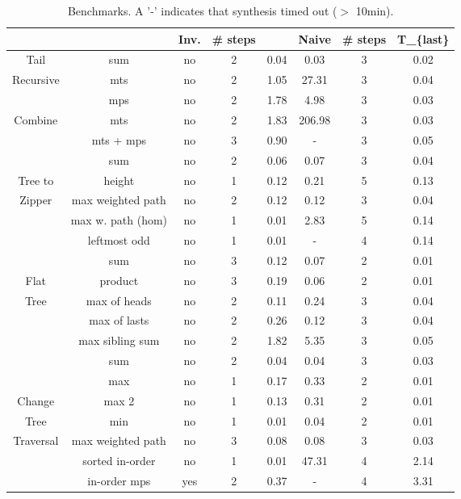 \begin{table}
	\caption{Benchmarks. A '-' indicates that synthesis timed out ($>$ 10min).}\label{table:experiments}
	{
		\begin{tabular}[h]{|c|c|c|c|c|c|c|c|}
			\hline
			 &   & Inv. & \# steps & \tool  & Naive & \# steps & T_\{last\}\\ 
			\hline
			Tail & sum & no & 2 & 0.04 & 0.03 & 3 & 0.02\\ 
			Recursive & mts & no & 2 & 1.05 & 27.31 & 3 & 0.04\\ 
			 & mps & no & 2 & 1.78 & 4.98 & 3 & 0.03\\ 
			\hline
			Combine & mts & no & 2 & 1.83 & 206.98 & 3 & 0.03\\ 
			 & mts + mps & no & 3 & 0.90 & - & 3 & 0.05\\ 
			\hline
			 & sum & no & 2 & 0.06 & 0.07 & 3 & 0.04\\ 
			Tree to & height & no & 1 & 0.12 & 0.21 & 5 & 0.13\\ 
			Zipper & max weighted path & no & 2 & 0.12 & 0.12 & 3 & 0.04\\ 
			 & max w. path (hom) & no & 1 & 0.01 & 2.83 & 5 & 0.14\\ 
			 & leftmost odd & no & 1 & 0.01 & - & 4 & 0.14\\ 
			\hline
			 & sum & no & 3 & 0.12 & 0.07 & 2 & 0.01\\ 
			Flat & product & no & 3 & 0.19 & 0.06 & 2 & 0.01\\ 
			Tree & max of heads & no & 2 & 0.11 & 0.24 & 3 & 0.04\\ 
			 & max of lasts & no & 2 & 0.26 & 0.12 & 3 & 0.04\\ 
			 & max sibling sum & no & 2 & 1.82 & 5.35 & 3 & 0.05\\ 
			\hline
			 & sum & no & 2 & 0.04 & 0.04 & 3 & 0.03\\ 
			 & max & no & 1 & 0.17 & 0.33 & 2 & 0.01\\ 
			Change & max 2 & no & 1 & 0.13 & 0.31 & 2 & 0.01\\ 
			Tree & min & no & 1 & 0.01 & 0.04 & 2 & 0.01\\ 
			Traversal & max weighted path & no & 3 & 0.08 & 0.08 & 3 & 0.03\\ 
			 & sorted in-order & no & 1 & 0.01 & 47.31 & 4 & 2.14\\ 
			 & in-order mps & yes & 2 & 0.37 & - & 4 & 3.31\\ 

\end{tabular}}
\end{table}

